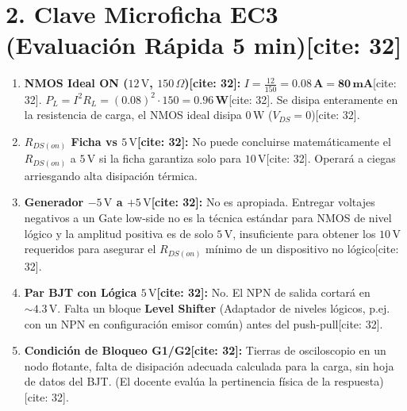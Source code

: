 \documentclass[11pt, a4paper]{article}
\begin{document}
\section*{2. Clave Microficha EC3 (Evaluación Rápida 5 min)[cite: 32]}
\begin{enumerate}
    \item \textbf{NMOS Ideal ON ($12\,\text{V}$, $150\,\Omega$)[cite: 32]:}
    $I = \frac{12}{150} = \mathbf{0.08\,\text{A} = 80\,\text{mA}}$[cite: 32]. 
    $P_L = I^2 R_L = (0.08)^2 \cdot 150 = \mathbf{0.96\,\text{W}}$[cite: 32]. Se disipa enteramente en la resistencia de carga, el NMOS ideal disipa $0\,\text{W}$ ($V_{DS}=0$)[cite: 32].
    
    \item \textbf{$R_{DS(on)}$ Ficha vs $5\,\text{V}$[cite: 32]:}
    No puede concluirse matemáticamente el $R_{DS(on)}$ a $5\,\text{V}$ si la ficha garantiza solo para $10\,\text{V}$[cite: 32]. Operará a ciegas arriesgando alta disipación térmica.
    
    \item \textbf{Generador $-5\,\text{V}$ a $+5\,\text{V}$[cite: 32]:}
    No es apropiada. Entregar voltajes negativos a un Gate low-side no es la técnica estándar para NMOS de nivel lógico y la amplitud positiva es de solo $5\,\text{V}$, insuficiente para obtener los $10\,\text{V}$ requeridos para asegurar el $R_{DS(on)}$ mínimo de un dispositivo no lógico[cite: 32].
    
    \item \textbf{Par BJT con Lógica $5\,\text{V}$[cite: 32]:}
    No. El NPN de salida cortará en $\sim 4.3\,\text{V}$. Falta un bloque \textbf{Level Shifter} (Adaptador de niveles lógicos, p.ej. con un NPN en configuración emisor común) antes del push-pull[cite: 32].
    
    \item \textbf{Condición de Bloqueo G1/G2[cite: 32]:}
    Tierras de osciloscopio en un nodo flotante, falta de disipación adecuada calculada para la carga, sin hoja de datos del BJT. (El docente evalúa la pertinencia física de la respuesta)[cite: 32].
\end{enumerate}
\end{document}
